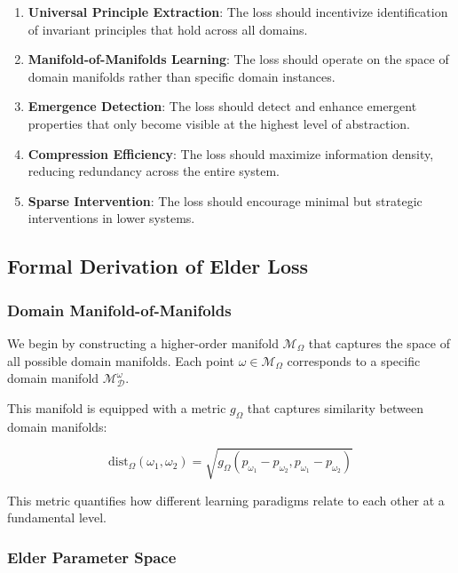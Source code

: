 \begin{enumerate}
\item \textbf{Universal Principle Extraction}: The loss should incentivize identification of invariant principles that hold across all domains.

\item \textbf{Manifold-of-Manifolds Learning}: The loss should operate on the space of domain manifolds rather than specific domain instances.

\item \textbf{Emergence Detection}: The loss should detect and enhance emergent properties that only become visible at the highest level of abstraction.

\item \textbf{Compression Efficiency}: The loss should maximize information density, reducing redundancy across the entire system.

\item \textbf{Sparse Intervention}: The loss should encourage minimal but strategic interventions in lower systems.
\end{enumerate}

\subsection{Formal Derivation of Elder Loss}

\subsubsection{Domain Manifold-of-Manifolds}

We begin by constructing a higher-order manifold $\mathcal{M}_{\Omega}$ that captures the space of all possible domain manifolds. Each point $\omega \in \mathcal{M}_{\Omega}$ corresponds to a specific domain manifold $\mathcal{M}_{\mathcal{D}}^{\omega}$.

This manifold is equipped with a metric $g_{\Omega}$ that captures similarity between domain manifolds:

\begin{equation}
\text{dist}_{\Omega}(\omega_1, \omega_2) = \sqrt{g_{\Omega}(p_{\omega_1} - p_{\omega_2}, p_{\omega_1} - p_{\omega_2})}
\end{equation}

This metric quantifies how different learning paradigms relate to each other at a fundamental level.

\subsubsection{Elder Parameter Space}

